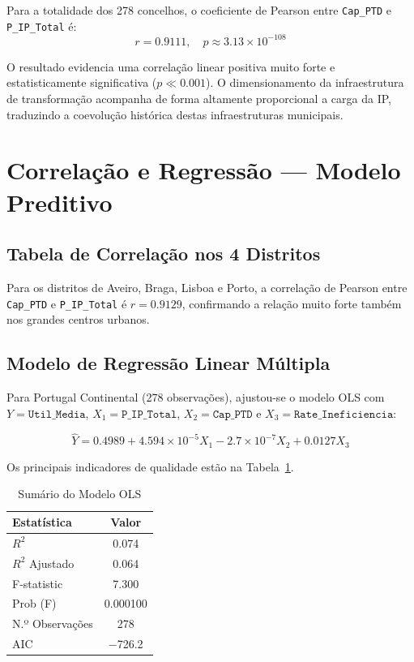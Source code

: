 \documentclass[conference]{IEEEtran}
\begin{document}
Para a totalidade dos 278 concelhos, o coeficiente de Pearson entre \texttt{Cap\_PTD} e \texttt{P\_IP\_Total} é:
\[
r = 0.9111, \quad p \approx 3.13 \times 10^{-108}
\]

O resultado evidencia uma correlação linear positiva muito forte e estatisticamente significativa ($p \ll 0.001$). O dimensionamento da infraestrutura de transformação acompanha de forma altamente proporcional a carga da IP, traduzindo a coevolução histórica destas infraestruturas municipais.

\section{Correlação e Regressão --- Modelo Preditivo}

\subsection{Tabela de Correlação nos 4 Distritos}

Para os distritos de Aveiro, Braga, Lisboa e Porto, a correlação de Pearson entre \texttt{Cap\_PTD} e \texttt{P\_IP\_Total} é $r = 0.9129$, confirmando a relação muito forte também nos grandes centros urbanos.

\subsection{Modelo de Regressão Linear Múltipla}

Para Portugal Continental (278 observações), ajustou-se o modelo OLS com $Y = \texttt{Util\_Media}$, $X_1 = \texttt{P\_IP\_Total}$, $X_2 = \texttt{Cap\_PTD}$ e $X_3 = \texttt{Rate\_Ineficiencia}$:

\begin{equation}
\hat{Y} = 0.4989 + 4.594 \!\times\! 10^{-5} X_1 - 2.7 \!\times\! 10^{-7} X_2 + 0.0127 X_3
\label{eq:modelo}
\end{equation}

Os principais indicadores de qualidade estão na Tabela~\ref{tab:ols}.

\begin{table}[htbp]
\caption{Sumário do Modelo OLS}
\label{tab:ols}
\centering
\begin{tabular}{lc}
\hline
\textbf{Estatística}  & \textbf{Valor}  \\
\hline
$R^2$                 & 0.074           \\
$R^2$ Ajustado        & 0.064           \\
F-statistic           & 7.300           \\
Prob (F)              & 0.000100        \\
N.º Observações       & 278             \\
AIC                   & $-$726.2        \\
\hline
\end{tabular}
\end{table}
\end{document}
